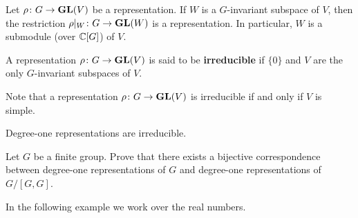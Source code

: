 Let $\rho\colon G\to\mathbf{GL}(V)$ be a representation. 
If $W$ is a $G$-invariant subspace of $V$, 
then the restriction $\rho|_W\colon G\to\mathbf{GL}(W)$
is a representation. In particular, $W$ is a submodule (over $\mathbb{C}[G]$) 
of $V$. 

\begin{definition}
    A representation $\rho\colon G\to\mathbf{GL}(V)$ is 
    said to be \textbf{irreducible} if 
    $\{0\}$ and $V$ are the only 
    $G$-invariant subspaces of $V$. 
\end{definition}

Note that a representation $\rho\colon G\to\mathbf{GL}(V)$ is irreducible
if and only if $V$ is simple. 

\begin{example}
    Degree-one representations are irreducible. 
\end{example}

\begin{exercise}
\label{xca:degree-one}
    Let $G$ be a finite group. 
    Prove that there exists a bijective correspondence between 
    degree-one representations of $G$ and 
    degree-one representations of $G/[G,G]$. 
\end{exercise}

In the following example we work over the real numbers. 

